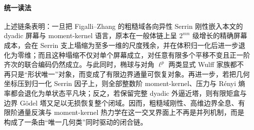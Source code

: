 \paragraph{统一读法}
上述链条表明：一旦把 Figalli--Zhang 的粗糙域各向异性 Serrin 刚性嵌入本文的 dyadic 屏幕与 moment-kernel 语言，原本在一般体链上呈 \(2^{mn}\) 级增长的精确屏幕成本，会在 Serrin 支上塌缩为至多一维的尺度残余，并在体积归一化后进一步退化为零维；而且这种塌缩不仅对单个屏幕成立，对任意有限多个平移不变且正一阶齐次的联合编码仍然成立。与此同时，椭球与对角 \(\ell^p\) 两类显式 Wulff 家族都不再只是“形状唯一”对象，而变成了有限边界通量可恢复对象。再进一步，若把几何坐标压到归一化 Serrin 因子上，则全部整数阶 moment-kernel、压力与 Rényi 熵率都会退化为单状态平凡块；反之，若保留完整 dyadic 外逼近塔，则有限矩盒与边界 Gödel 塔又足以无损恢复整个闭域。因而，粗糙域刚性、高维边界全息、有限阶通量反演与 moment-kernel 热力学在这一交叉界面上不再是并列机制，而是构成了一条由“唯一几何类”同时驱动的闭合链。

\endinput
